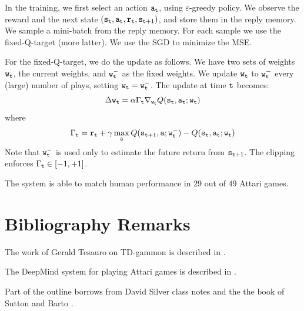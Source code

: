 In the training, we first select an action ${\tt a}_{\tt t}$, using
$\varepsilon$-greedy policy. We observe the reward and the next
state
$({\tt s}_{\tt t},{\tt a}_{\tt t},{\tt r}_{\tt t},{\tt s}_{{\tt t}+1})$,
and store them in the reply memory. We sample a mini-batch from the
reply memory. For each sample we use the fixed-Q-target (more
latter). We use the SGD to minimize the MSE.

For the fixed-Q-target, we do the update as follows. We have two
sets of weights ${\tt w}_{\tt t}$, the current weights, and
${\tt w}^-_{\tt t}$ as the fixed weights. We update ${\tt w}_{\tt t}$
to ${\tt w}^-_{\tt t}$ every (large) number of plays, setting
${\tt w}_{\tt t}={\tt w}^-_{\tt t}$. The update at time ${\tt t}$
becomes:
\[
\Delta {\tt w}_{\tt t} = \alpha \Gamma_{\tt t} \nabla_{{\tt w}_{\tt t}}
Q({\tt s}_{\tt t},{\tt a}_{\tt t};{\tt w}_{\tt t})
\]
where
\[
\Gamma_{{\tt t}}={\tt r}_{\tt t}+\gamma \max_{\tt a}
Q({\tt s}_{{\tt t}+1},{\tt a};{\tt w}^-_{\tt t})-Q({\tt s}_{\tt t},{\tt a}_{\tt t};{\tt w}_{\tt t})
\]
Note that ${\tt w}^-_{\tt t}$ is used only to estimate the future
return from ${\tt s}_{{\tt t}+1}$. The clipping enforces
$\Gamma_{\tt t}\in[-1,+1]$.

The system is able to match human performance in $29$ out of $49$
Attari games.







\section{Bibliography Remarks}

The work of Gerald Tesauro on TD-gammon is described in
\cite{Tesauro95,Tesauro02}.

The DeepMind system for playing Attari games is described in
\cite{MnihKSRVBGRFOPB15}.


Part of the outline borrows from David Silver class notes and the
the book of Sutton and Barto \cite{SuttonB98}.
